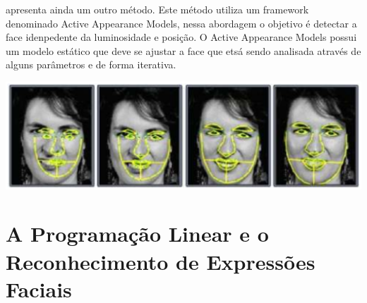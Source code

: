 \cite{FernandoGil} apresenta ainda um outro método. Este método utiliza um framework denominado Active Appearance Models, nessa abordagem o objetivo é detectar a face idenpedente da luminosidade e posição. O  Active Appearance Models
possui um modelo estático que deve se ajustar a face que etsá sendo analisada através de alguns parâmetros e de forma iterativa.
\begin{center}
	\includegraphics[scale=1.00]{graficos/metodo2_classi}
\end{center}
\section{A Programação Linear e o Reconhecimento de Expressões Faciais}
